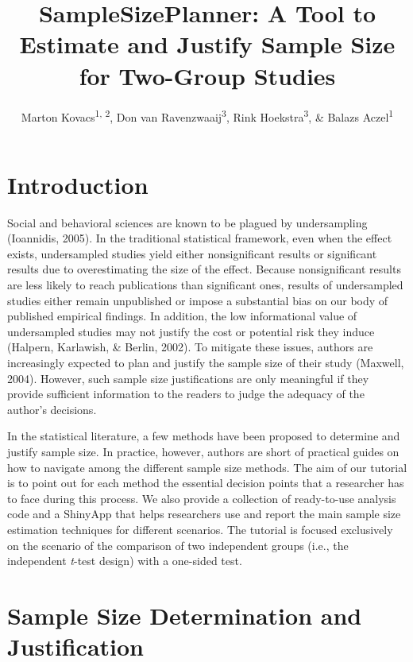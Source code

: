 \documentclass[
  english,
  man,floatsintext]{apa6}
\title{SampleSizePlanner: A Tool to Estimate and Justify Sample Size for Two-Group Studies}
\author{Marton Kovacs\textsuperscript{1, 2}, Don van Ravenzwaaij\textsuperscript{3}, Rink Hoekstra\textsuperscript{3}, \& Balazs Aczel\textsuperscript{1}}
\date{}
\affiliation{\vspace{0.5cm}\textsuperscript{1} Institute of Psychology, ELTE Eotvos Lorand University, Budapest, Hungary\\\textsuperscript{2} Doctoral School of Psychology, ELTE Eotvos Lorand University, Budapest, Hungary\\\textsuperscript{3} University of Groningen, Groningen, The Netherlands}
\begin{document}
\maketitle

\hypertarget{introduction}{%
\section{Introduction}\label{introduction}}

Social and behavioral sciences are known to be plagued by undersampling (Ioannidis, 2005). In the traditional statistical framework, even when the effect exists, undersampled studies yield either nonsignificant results or significant results due to overestimating the size of the effect. Because nonsignificant results are less likely to reach publications than significant ones, results of undersampled studies either remain unpublished or impose a substantial bias on our body of published empirical findings. In addition, the low informational value of undersampled studies may not justify the cost or potential risk they induce (Halpern, Karlawish, \& Berlin, 2002). To mitigate these issues, authors are increasingly expected to plan and justify the sample size of their study (Maxwell, 2004). However, such sample size justifications are only meaningful if they provide sufficient information to the readers to judge the adequacy of the author's decisions.

In the statistical literature, a few methods have been proposed to determine and justify sample size. In practice, however, authors are short of practical guides on how to navigate among the different sample size methods. The aim of our tutorial is to point out for each method the essential decision points that a researcher has to face during this process. We also provide a collection of ready-to-use analysis code and a ShinyApp that helps researchers use and report the main sample size estimation techniques for different scenarios. The tutorial is focused exclusively on the scenario of the comparison of two independent groups (i.e., the independent \emph{t}-test design) with a one-sided test.

\hypertarget{sample-size-determination-and-justification}{%
\section{Sample Size Determination and Justification}\label{sample-size-determination-and-justification}}
\end{document}
